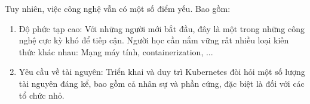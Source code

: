 Tuy nhiên, việc công nghệ vẫn có một số điểm yếu. Bao gồm:
\begin{enumerate}
    \item Độ phức tạp cao: Với những người mới bắt đầu, đây là một trong những công nghệ cực kỳ khó để tiếp cận. Người học cần nắm vững rất nhiều loại kiến thức khác nhau: Mạng máy tính, containerization, ...
    \item Yêu cầu về tài nguyên: Triển khai và duy trì Kubernetes đòi hỏi một số lượng tài nguyên đáng kể, bao gồm cả nhân sự và phần cứng, đặc biệt là đối với các tổ chức nhỏ.
\end{enumerate}
